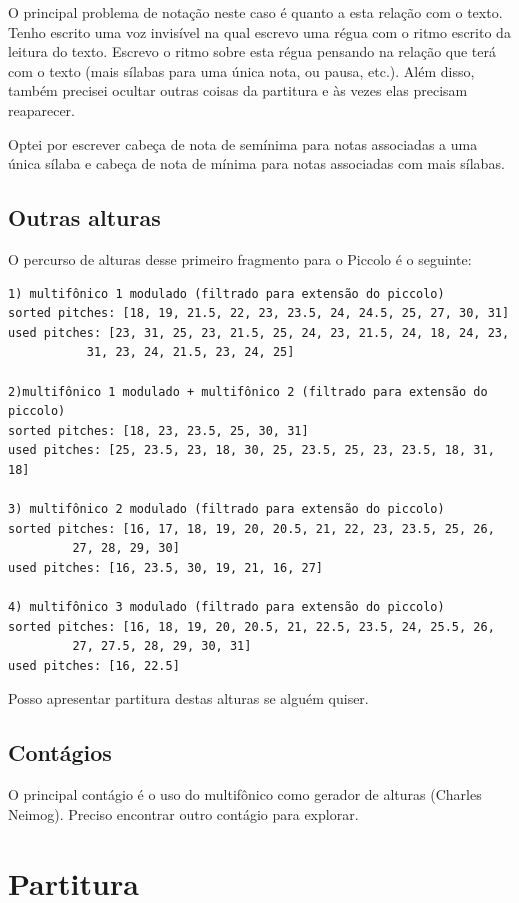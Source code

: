 \documentclass[a4paper, 12pt]{article}
\begin{document}
O principal problema de notação neste caso é quanto a esta relação com o texto. Tenho escrito uma voz invisível na qual escrevo uma régua com o ritmo escrito da leitura do texto. Escrevo o ritmo sobre esta régua pensando na relação que terá com o texto (mais sílabas para uma única nota, ou pausa, etc.). Além disso, também precisei ocultar outras coisas da partitura e às vezes elas precisam reaparecer.

Optei por escrever cabeça de nota de semínima para notas associadas a uma única sílaba e cabeça de nota de mínima para notas associadas com mais sílabas.

\subsection*{Outras alturas}
\label{sec:org54a7eb0}
O percurso de alturas desse primeiro fragmento para o Piccolo é o seguinte:

\begin{verbatim}
1) multifônico 1 modulado (filtrado para extensão do piccolo)
sorted pitches: [18, 19, 21.5, 22, 23, 23.5, 24, 24.5, 25, 27, 30, 31]
used pitches: [23, 31, 25, 23, 21.5, 25, 24, 23, 21.5, 24, 18, 24, 23,
	       31, 23, 24, 21.5, 23, 24, 25]

2)multifônico 1 modulado + multifônico 2 (filtrado para extensão do piccolo)
sorted pitches: [18, 23, 23.5, 25, 30, 31]
used pitches: [25, 23.5, 23, 18, 30, 25, 23.5, 25, 23, 23.5, 18, 31, 18]

3) multifônico 2 modulado (filtrado para extensão do piccolo)
sorted pitches: [16, 17, 18, 19, 20, 20.5, 21, 22, 23, 23.5, 25, 26,
		 27, 28, 29, 30]
used pitches: [16, 23.5, 30, 19, 21, 16, 27]

4) multifônico 3 modulado (filtrado para extensão do piccolo)
sorted pitches: [16, 18, 19, 20, 20.5, 21, 22.5, 23.5, 24, 25.5, 26,
		 27, 27.5, 28, 29, 30, 31]
used pitches: [16, 22.5]
\end{verbatim}

Posso apresentar partitura destas alturas se alguém quiser.

\subsection*{Contágios}
\label{sec:org4ff4172}
O principal contágio é o uso do multifônico como gerador de alturas (Charles Neimog). Preciso encontrar outro contágio para explorar.


\section*{Partitura}
\label{sec:orgd7b159b}
\end{document}
